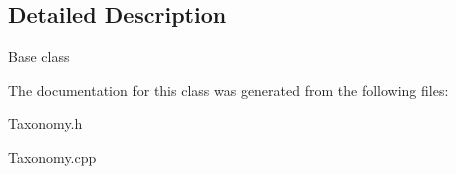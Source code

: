 \subsection{Detailed Description}
Base class 

The documentation for this class was generated from the following files\+:\begin{DoxyCompactItemize}
\item 
Taxonomy.\+h\item 
Taxonomy.\+cpp\end{DoxyCompactItemize}
